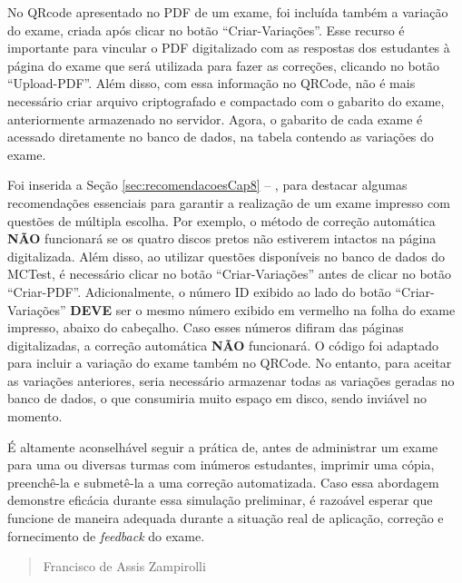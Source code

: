 No QRcode apresentado no PDF de um exame, foi incluída também a variação do exame, criada após clicar no botão ``Criar-Variações''. Esse recurso é importante para vincular o PDF digitalizado com as respostas dos estudantes à página do exame que será utilizada para fazer as correções, clicando no botão ``Upload-PDF''. Além disso, com essa informação no QRCode, não é mais necessário criar arquivo criptografado e compactado com o gabarito do exame, anteriormente armazenado no servidor. Agora, o gabarito de cada exame é acessado diretamente no banco de dados, na tabela contendo as variações do exame.

Foi inserida a Seção \ref{sec:recomendacoesCap8} -- , para destacar algumas recomendações essenciais para garantir a realização de um exame impresso com questões de múltipla escolha. Por exemplo, o método de correção automática \textbf{NÃO} funcionará se os quatro discos pretos não estiverem intactos na página digitalizada. Além disso, ao utilizar questões disponíveis no banco de dados do MCTest, é necessário clicar no botão ``Criar-Variações'' antes de clicar no botão ``Criar-PDF''. Adicionalmente, o número ID exibido ao lado do botão ``Criar-Variações'' \textbf{DEVE} ser o mesmo número exibido em vermelho na folha do exame impresso, abaixo do cabeçalho. Caso esses números difiram das páginas digitalizadas, a correção automática \textbf{NÃO} funcionará. O código foi adaptado para incluir a variação do exame também no QRCode. No entanto, para aceitar as variações anteriores, seria necessário armazenar todas as variações geradas no banco de dados, o que consumiria muito espaço em disco, sendo inviável no momento.

É altamente aconselhável seguir a prática de, antes de administrar um exame para uma ou diversas turmas com inúmeros estudantes, imprimir uma cópia, preenchê-la e submetê-la a uma correção automatizada. Caso essa abordagem demonstre eficácia durante essa simulação preliminar, é razoável esperar que funcione de maneira adequada durante a situação real de aplicação, correção e fornecimento de \textit{feedback} do exame.

\begin{verse}
    \vspace*{2mm}
	\begin{flushright}
		Francisco de Assis Zampirolli\\
            \date{\today}
	\end{flushright}
\end{verse}
